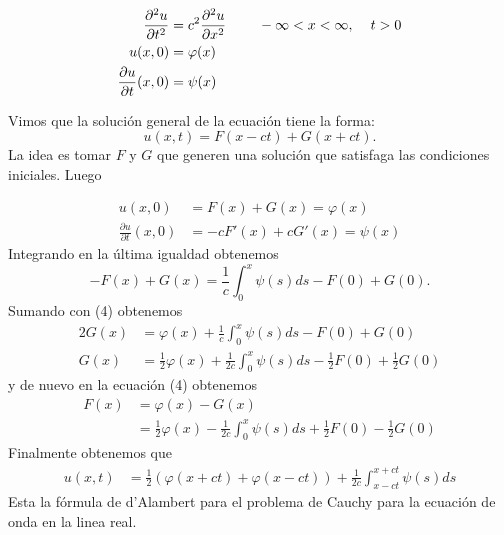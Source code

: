 \documentclass[11pt]{book}
\theoremstyle{plain}
\theoremstyle{definition}
\begin{document}
\begin{align*}
    \frac{\partial^2 u}{\partial t^2} &= c^2 \frac{\partial^2 u}{\partial x^2} \hspace{8mm} -\infty < x < \infty, \hspace{4mm} t > 0\\ 
    u(x,0)&= \varphi(x) \\
    \frac{\partial u}{\partial t}(x,0) &= \psi(x) \\
\end{align*}

Vimos que la solución general de la ecuación tiene la forma:
\[
    u(x,t) = F(x-ct) + G(x+ct)
.\]
La idea es tomar $F$ y $G$ que generen una solución que satisfaga las condiciones iniciales. Luego

\setcounter{equation}{0}
\begin{align}
    u(x,0) &= F(x) + G(x) = \varphi(x)\\
    \frac{\partial u}{\partial t}(x,0) &= -cF'(x) + cG'(x) = \psi(x)
\end{align}
Integrando en la última igualdad obtenemos
\[
 -F(x) + G(x) = \frac{1}{c}\int_{0}^{x}\psi(s)ds - F(0) + G(0)
.\]
Sumando con (4) obtenemos
\begin{align*}
    2G(x) &= \varphi(x) + \frac{1}{c}\int_{0}^{x}\psi(s)ds - F(0) + G(0)\\
    G(x) &= \frac{1}{2} \varphi(x) + \frac{1}{2c}\int_{0}^{x}\psi(s)ds - \frac{1}{2}F(0) + \frac{1}{2}G(0)
\end{align*}
y de nuevo en la ecuación (4) obtenemos
\begin{align*}
    F(x) &= \varphi(x) - G(x)\\
    &= \frac{1}{2} \varphi(x) - \frac{1}{2c}\int_{0}^{x}\psi(s)ds + \frac{1}{2}F(0) - \frac{1}{2}G(0)
\end{align*}
Finalmente obtenemos que
\begin{align}
    u(x,t) &= \frac{1}{2}\left( \varphi(x +ct) + \varphi(x -ct)\right) +\frac{1}{2c}\int_{x-ct}^{x+ct}\psi(s)ds
\end{align}
Esta la fórmula de d'Alambert para el problema de Cauchy para la ecuación de onda en la linea real.
\end{document}

